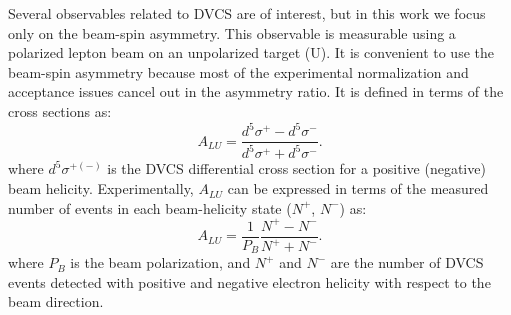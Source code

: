 \documentclass[preprint,nofootinbib,showpacs,prl,superscriptaddress,secnumarabic,amssymb,nobibnotes,aps,floatfix]{revtex4}
\begin{document}
Several observables related to DVCS are of interest, but in this work we focus only 
on the beam-spin asymmetry. This  observable is measurable using a polarized 
lepton beam on an unpolarized target (U). It is convenient to use the beam-spin 
asymmetry because most of the experimental normalization and acceptance issues 
cancel out in the asymmetry ratio. It is defined in terms of the cross sections 
as:
  \begin{equation}
  A_{LU} = \frac{d^{5}\sigma^{+} - d^{5}\sigma^{-} }
                {d^{5}\sigma^{+} + d^{5}\sigma^{-}}.
    \label{BSA_equation}
  \end{equation}
where $d^{5}\sigma^{+(-)}$ is the DVCS differential cross 
section for a positive (negative) beam helicity. Experimentally, $A_{LU}$ 
can be expressed in terms of the measured number of events in each 
beam-helicity state ($N^{+}$, $N^{-}$) as:
\begin{equation}
A_{LU} = \frac{1}{P_{B}} \frac{N^{+} - N^{-}}{N^{+} + N^{-} }.
\end{equation}
where $P_{B}$ is the beam polarization, and $N^{+}$ and $N^{-}$ are the number 
of DVCS events detected with positive and negative electron helicity with 
respect to the beam direction. 
\end{document}
